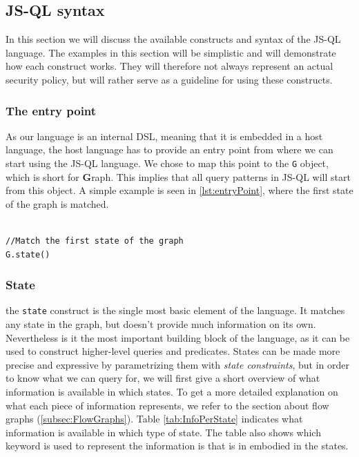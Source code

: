\subsection{JS-QL syntax}
\label{subsec:Syntax}
 In this section we will discuss the available constructs and syntax of the JS-QL language. The examples in this section will be simplistic and will demonstrate how each construct works. They will therefore not always represent an actual security policy, but will rather serve as a guideline for using these constructs.

\subsubsection{The entry point}
As our language is an internal DSL, meaning that it is embedded in a host language, the host language has to provide an entry point from where we can start using the JS-QL language. We chose to map this point to the \texttt{G} object, which is short for \textbf{G}raph. This implies that all query patterns in JS-QL will start from this object. A simple example is seen in \ref{lst:entryPoint}, where the first state of the graph is matched.

\begin{lstlisting}[label={lst:entryPoint},language=JSQL,caption=Matching the first state starting from entry point \texttt{G},mathescape=true]  % float=t?

//Match the first state of the graph
G.state()
\end{lstlisting}

\subsubsection{State}
the \texttt{state} construct is the single most basic element of the language. It matches any state in the graph, but doesn't provide much information on its own. Nevertheless is it the most important building block of the language, as it can be used to construct higher-level queries and predicates. States can be made more precise and expressive by parametrizing them with \textit{state constraints}, but in order to know what we can query for, we will first give a short overview of what information is available in which states. To get a more detailed explanation on what each piece of information represents, we refer to the section about flow graphs (\ref{subsec:FlowGraphs}). Table \ref{tab:InfoPerState} indicates what information is available in which type of state. The table also shows which keyword is used to represent the information is that is in embodied in the states.

